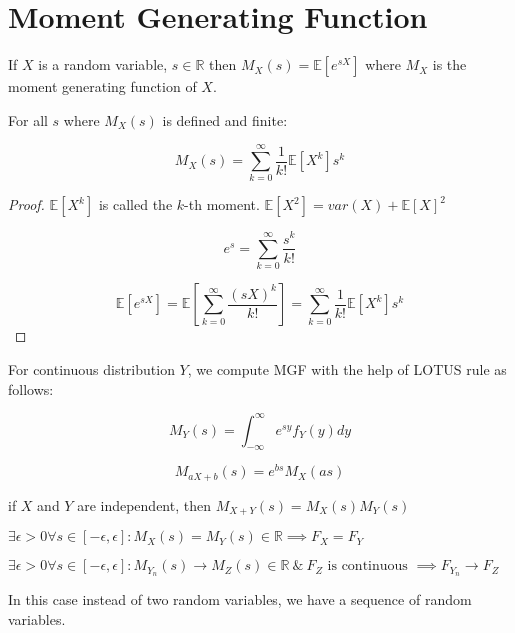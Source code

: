 \chapter{Moment Generating Function}

\begin{defn}
	If $X$ is a random variable, $s \in \mathbb{R}$ then $M_X(s) = \mathbb{E}[e^{sX}]$ where $M_X$ is the moment generating function of $X$.
\end{defn}

\begin{thm}
	For all $s$ where $M_X(s)$ is defined and finite:
	
	$$
	M_X(s) = \sum_{k=0}^\infty \frac{1}{k!} \mathbb{E}[X^k] s^k
	$$
\end{thm}

\begin{proof}
	$\mathbb{E}[X^k]$ is called the $k$-th moment. $\mathbb{E}[X^2] = var(X) + \mathbb{E}[X]^2$
	
	$$
	e^s = \sum_{k=0}^\infty \frac{s^k}{k!}
	$$
	
	$$
	\mathbb{E}[e^{sX}] = \mathbb{E}[\sum^{\infty}_{k=0} \frac{(sX)^k}{k!}] = \sum^{\infty}_{k=0} \frac{1}{k!} \mathbb{E}[X^k] s^k
	$$
\end{proof}

For continuous distribution $Y$, we compute MGF with the help of LOTUS rule as follows:

$$
M_Y(s) = \int_{-\infty}^\infty e^{sy} f_Y(y) dy
$$

\begin{thm}
	$$
	M_{aX+b}(s) = e^{bs}M_X(as)
	$$
\end{thm}

\begin{thm}
	if $X$ and $Y$ are independent, then $M_{X+Y}(s) = M_X(s)M_Y(s)$
\end{thm}

\begin{thm}
	$\exists \epsilon > 0 \forall s \in [-\epsilon, \epsilon]: M_X(s) = M_Y(s) \in \mathbb{R} \implies F_X = F_Y$
\end{thm}

\begin{thm}
	$\exists \epsilon > 0 \forall s \in [-\epsilon, \epsilon]: M_{Y_n}(s) \rightarrow  M_Z(s) \in \mathbb{R} \ \&  \ F_Z \text{ is continuous } \implies F_{Y_n} \rightarrow F_Z$
\end{thm}

In this case instead of two random variables, we have a sequence of random variables.

